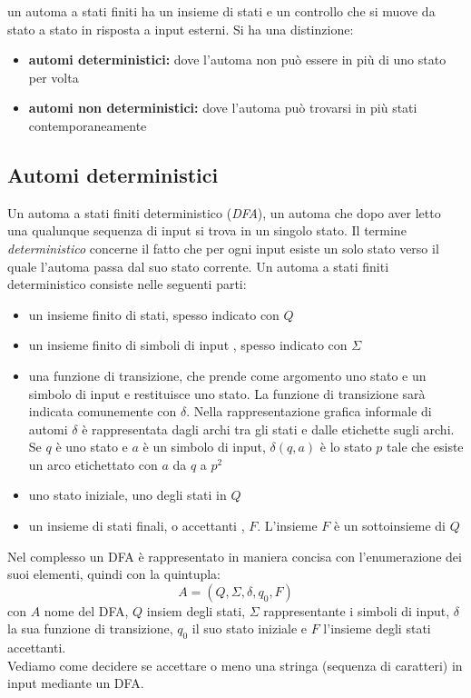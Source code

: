 
un automa a stati finiti ha un insieme di stati e un controllo che si muove da stato a stato in risposta a input esterni. Si ha una distinzione:
\begin{itemize}
	\item \textbf{automi deterministici:} dove l'automa non può essere in più di uno stato per volta
	\item \textbf{automi non deterministici:} dove l'automa può trovarsi in più stati contemporaneamente
\end{itemize}
\subsection{Automi deterministici}
Un automa a stati finiti deterministico (\textit{DFA}), un automa che dopo aver letto una qualunque sequenza di input si trova in un singolo stato. Il termine \textit{deterministico} concerne il fatto che per ogni input esiste un solo stato verso il quale l'automa passa dal suo stato corrente. Un automa a stati finiti deterministico consiste nelle seguenti parti:
\begin{itemize}
	\item un insieme finito di stati, spesso indicato con $Q$
	\item un insieme finito di simboli di input , spesso indicato con $\Sigma$
	\item una funzione di transizione, che prende come argomento uno stato e un simbolo di input e restituisce uno stato. La funzione di transizione sarà indicata comunemente con $\delta$. Nella rappresentazione grafica informale di automi $\delta$ è rappresentata dagli archi tra gli stati e dalle etichette sugli archi. Se $q$ è uno stato e $a$ è un simbolo di input, $\delta(q,a)$ è lo stato $p$ tale che esiste un arco etichettato con $a$ da $q$ a $p^2$
	\item uno stato iniziale, uno degli stati in $Q$
	\item un insieme di stati finali, o accettanti , $F$. L'insieme $F$ è un sottoinsieme di $Q$
\end{itemize}
Nel complesso un DFA è rappresentato in maniera concisa con l'enumerazione dei suoi elementi, quindi con la quintupla:
$$A=(Q,\Sigma,\delta,q_0,F)$$
con $A$ nome del DFA, $Q$ insiem degli stati, $\Sigma$ rappresentante i simboli di input, $\delta$ la sua funzione di transizione, $q_0$ il suo stato iniziale e $F$ l'insieme degli stati accettanti.\\
Vediamo come decidere se accettare o meno una stringa (sequenza di caratteri) in input mediante un DFA.\\
